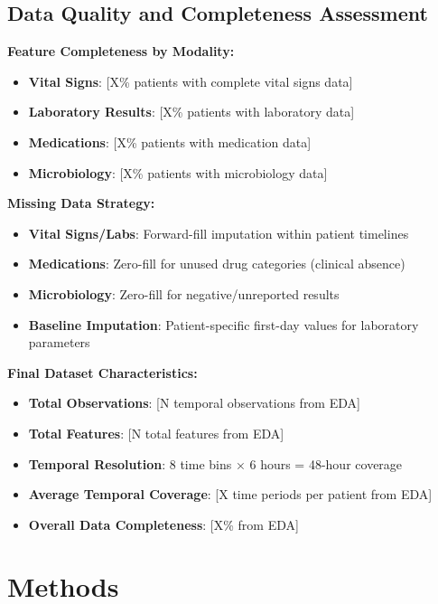 \documentclass[11pt]{article}
\begin{document}
\subsection{Data Quality and Completeness Assessment}

\textbf{Feature Completeness by Modality:}
\begin{itemize}
    \item \textbf{Vital Signs}: [X\% patients with complete vital signs data]
    \item \textbf{Laboratory Results}: [X\% patients with laboratory data]  
    \item \textbf{Medications}: [X\% patients with medication data]
    \item \textbf{Microbiology}: [X\% patients with microbiology data]
\end{itemize}

\textbf{Missing Data Strategy:}
\begin{itemize}
    \item \textbf{Vital Signs/Labs}: Forward-fill imputation within patient timelines
    \item \textbf{Medications}: Zero-fill for unused drug categories (clinical absence)
    \item \textbf{Microbiology}: Zero-fill for negative/unreported results
    \item \textbf{Baseline Imputation}: Patient-specific first-day values for laboratory parameters
\end{itemize}

\textbf{Final Dataset Characteristics:}
\begin{itemize}
    \item \textbf{Total Observations}: [N temporal observations from EDA]
    \item \textbf{Total Features}: [N total features from EDA]
    \item \textbf{Temporal Resolution}: 8 time bins × 6 hours = 48-hour coverage
    \item \textbf{Average Temporal Coverage}: [X time periods per patient from EDA]
    \item \textbf{Overall Data Completeness}: [X\% from EDA]
\end{itemize}

\section{Methods}
\end{document}
